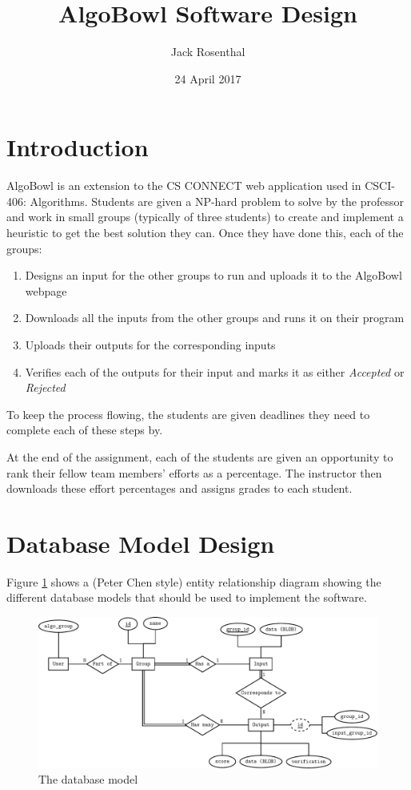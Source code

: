 \documentclass[12pt]{article}
\title{AlgoBowl Software Design}
\date{24 April 2017}
\author{Jack Rosenthal}
\begin{document}
\maketitle

\section{Introduction}

AlgoBowl is an extension to the CS CONNECT web application used in CSCI-406:
Algorithms. Students are given a NP-hard problem to solve by the professor and
work in small groups (typically of three students) to create and implement a
heuristic to get the best solution they can. Once they have done this, each of
the groups:
\begin{enumerate}
    \item Designs an input for the other groups to run and uploads it to the
        AlgoBowl webpage
    \item Downloads all the inputs from the other groups and runs it on their
        program
    \item Uploads their outputs for the corresponding inputs
    \item Verifies each of the outputs for their input and marks it as either
        \emph{Accepted} or \emph{Rejected}
\end{enumerate}

To keep the process flowing, the students are given deadlines they need to
complete each of these steps by.

At the end of the assignment, each of the students are given an opportunity to
rank their fellow team members' efforts as a percentage. The instructor then
downloads these effort percentages and assigns grades to each student.

\section{Database Model Design}

Figure \ref{erd} shows a (Peter Chen style) entity relationship diagram showing
the different database models that should be used to implement the software.

\begin{figure}
    \includegraphics[width=\textwidth]{graphics/algo_erd.pdf}
    \caption{The database model}
    \label{erd}
\end{figure}
\end{document}
